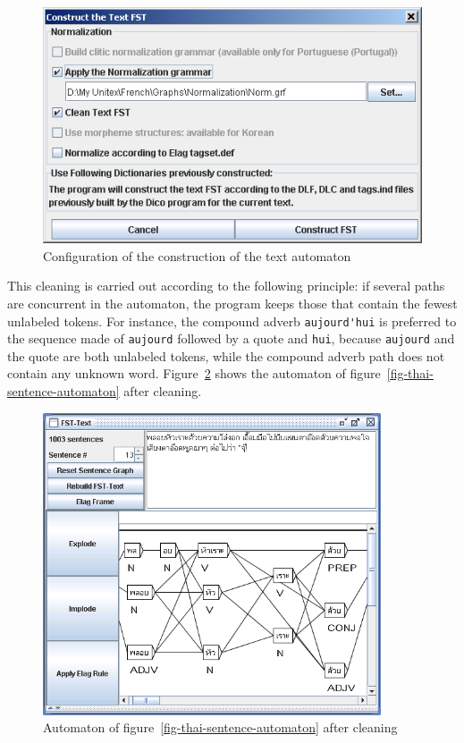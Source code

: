 \begin{figure}[!ht]
\begin{center}
\includegraphics[width=12.2cm]{resources/img/fig7-10.png}
\caption{Configuration of the construction of the text automaton
\label{fig-Txt2Tfst-configuration}}
\end{center}
\end{figure}

\bigskip
\noindent This cleaning is carried out according to the following principle: if several
paths are concurrent in the automaton, the program keeps those that contain the
fewest unlabeled tokens. For instance, the compound adverb \verb+aujourd'hui+ is
preferred to the sequence made of \verb+aujourd+ followed by a quote and \verb+hui+, because
\verb+aujourd+ and the quote are both unlabeled tokens, while
the compound adverb path does not contain any unknown word.
Figure~\ref{fig-clean-thai-sentence-automaton} shows the automaton of
figure~\ref{fig-thai-sentence-automaton} after cleaning.

\begin{figure}[!ht]
\begin{center}
\includegraphics[width=10cm]{resources/img/fig7-11.png}
\caption{Automaton of
figure~\ref{fig-thai-sentence-automaton} after cleaning\label{fig-clean-thai-sentence-automaton}}
\end{center}
\end{figure}

